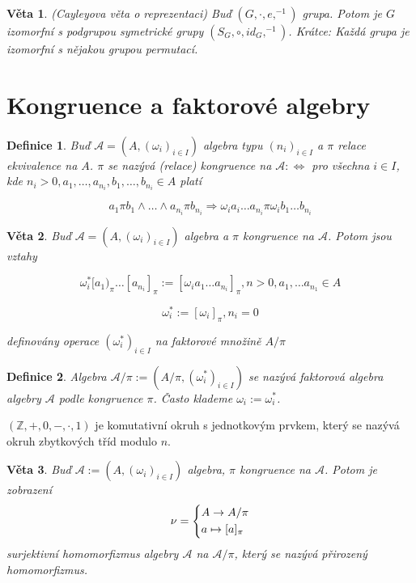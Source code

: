 \documentclass[a4paper, 11pt]{report}
\newtheorem{mydef}{Definice}[chapter]
\newtheorem{veta}{Věta}[chapter]
\begin{document}
\begin{veta}
(Cayleyova věta o reprezentaci) Buď $(G, \cdot, e, ^{-1})$ grupa. Potom je $G$ izomorfní s podgrupou symetrické grupy $(S_G, \circ, id_G, ^{-1})$. Krátce: Každá grupa je izomorfní s nějakou grupou permutací.
\end{veta}

\section{Kongruence a faktorové algebry}

\begin{mydef}
Buď $\mathcal{A} = (A, (\omega_i)_{i \in I})$ algebra typu $(n_i)_{i \in I}$ a $\pi$ relace ekvivalence na $A$. $\pi$ se nazývá (relace) kongruence na $\mathcal{A} : \Leftrightarrow$ pro všechna $i \in I$, kde $n_i > 0, a_1, \dots, a_{n_i}, b_1, \dots, b_{n_i} \in A$ platí

$$ a_1 \pi b_1 \land \dots \land a_{n_i} \pi b_{n_i} \Rightarrow \omega_i a_i \dots a_{n_i} \pi \omega_i b_1 \dots b_{n_i} $$
\end{mydef}

\begin{veta}
Buď $\mathcal{A} = (A, (\omega_i)_{i \in I})$ algebra a $\pi$ kongruence na $\mathcal{A}$. Potom jsou vztahy

$$ \omega_i^*[a_1)_\pi \dots [a_{n_i}]_\pi := [\omega_i a_1 \dots a_{n_i}]_\pi, n > 0, a_1, \dots a_{n_1} \in A$$

$$ \omega_i^* := [\omega_i]_\pi, n_i = 0 $$

definovány operace $(\omega_i^*)_{i \in I}$ na faktorové množině $A/\pi$
\end{veta}

\begin{mydef}
Algebra $\mathcal{A}/\pi := (A/\pi, (\omega_i^*)_{i \in I})$ se nazývá faktorová algebra algebry $\mathcal{A}$ podle kongruence $\pi$. Často klademe $\omega_i := \omega_i^*$.
\end{mydef}

$(\mathbb{Z}, +, 0, -, \cdot, 1)$ je komutativní okruh s jednotkovým prvkem, který se nazývá okruh zbytkových tříd modulo $n$.

\begin{veta}
Buď $\mathcal{A} := (A, (\omega_i)_{i \in I})$ algebra, $\pi$ kongruence na $\mathcal{A}$. Potom je zobrazení
$$
 \nu =
   \begin{dcases}
     A \to A / \pi \\
     a \mapsto [a]_\pi
   \end{dcases}
$$
surjektivní homomorfizmus algebry $\mathcal{A}$ na $\mathcal{A}/\pi$, který se nazývá přirozený homomorfizmus.
\end{veta}
\end{document}

